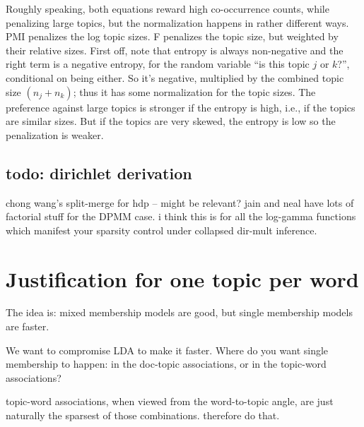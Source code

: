 \documentclass[11pt,letterpaper]{article}
\theoremstyle{definition}
\begin{document}
Roughly speaking, both equations reward high co-occurrence counts, while penalizing large topics, but the normalization happens in rather different ways.  PMI penalizes the log topic sizes.  F penalizes the topic size, but weighted by their relative sizes.   First off, note that entropy is always non-negative and the right term is a negative entropy, for the random variable ``is this topic $j$ or $k$?'', conditional on being either.  So it's negative, multiplied by the combined topic size $(n_j+n_k)$; thus it has some normalization for the topic sizes.  The preference against large topics is stronger if the entropy is high, i.e., if the topics are similar sizes.  But if the topics are very skewed, the entropy is low so the penalization is weaker.

\subsection{todo: dirichlet derivation}

chong wang's split-merge for hdp -- might be relevant?  jain and neal have lots of factorial stuff for the DPMM case.  i think this is for all the log-gamma functions which manifest your sparsity control under collapsed dir-mult inference.

\section{Justification for one topic per word}

The idea is: mixed membership models are good, but single membership models are faster.

We want to compromise LDA to make it faster.
Where do you want single membership to happen: in the doc-topic associations, or in the topic-word associations?

topic-word associations, when viewed from the word-to-topic angle, are just naturally the sparsest of those combinations.  therefore do that.

\end{document}
